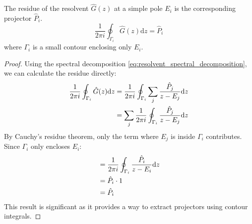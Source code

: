 \begin{theorem}
  The residue of the resolvent $\hat G(z)$ at a simple pole $E_i$
  is the corresponding projector $\hat P_i$.
  \begin{equation} \label{eq:resolvent_residue}
    \frac{1}{2\pi i}\oint_{\Gamma_i} \hat G(z)\mathrm dz = \hat P_i
  \end{equation}
  where $\Gamma_i$ is a small contour enclosing only $E_i$.
\end{theorem}
\begin{proof}
  Using the spectral decomposition
  \eqref{eq:resolvent_spectral_decomposition}, we can calculate the
  residue directly:
  \begin{align}
    \frac{1}{2\pi i}\oint_{\Gamma_i} \hat G(z)\mathrm dz &=
    \frac{1}{2\pi i}\oint_{\Gamma_i} \sum_j \frac{\hat P_j}{z -
    E_j}\mathrm dz \\
    &= \sum_j \frac{1}{2\pi i}\oint_{\Gamma_i} \frac{\hat P_j}{z
    - E_j}\mathrm dz \notag
  \end{align}
  By Cauchy's residue theorem, only the term where $E_j$ is inside
  $\Gamma_i$ contributes. Since $\Gamma_i$ only encloses $E_i$:
  \begin{align}
    &= \frac{1}{2\pi i}\oint_{\Gamma_i} \frac{\hat P_i}{z -
    E_i}\mathrm dz \\
    &= \hat P_i \cdot 1 \notag \\
    &= \hat P_i \notag
  \end{align}
  This result is significant as it provides a way to extract
  projectors using contour integrals.
\end{proof}

